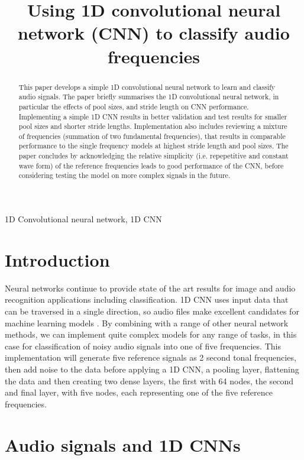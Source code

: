 \documentclass{article}
\title{Using 1D convolutional neural network (CNN) to classify audio frequencies}
\begin{document}
%
\maketitle
%
\begin{abstract}
This paper develops a simple 1D convolutional neural network to learn and classify audio signals.  The paper briefly summarises the 1D convolutional neural network, in particular the effects of pool sizes, and stride length on CNN performance.  Implementing a simple 1D CNN results in better validation and test results for smaller pool sizes and shorter stride lengths.  Implementation also includes reviewing a mixture of frequencies (summation of two fundamental frequencies), that results in comparable performance to the single frequency models at highest stride length and pool sizes.  The paper concludes by acknowledging the relative simplicity (i.e. repepetitive and constant wave form) of the reference frequencies leads to good performance of the CNN, before considering testing the model on more complex signals in the future.
\end{abstract}
%
\begin{keywords}
1D Convolutional neural network, 1D CNN
\end{keywords}
%
\section{Introduction}
\label{sec:intro}
%
Neural networks continue to provide state of the art results for image and audio recognition applications \cite{brownlee_1d_2018} including classification.  1D CNN uses input data that can be traversed in a single direction, so audio files make excellent candidates for machine learning models \cite{noauthor_convolutional_nodate}.  By combining with a range of other neural network methods, we can implement quite complex models for any range of tasks, in this case for classification of noisy audio signals into one of five frequencies.  This implementation will generate five reference signals as 2 second tonal frequencies, then add noise to the data before applying a 1D CNN, a pooling layer, flattening the data and then creating two dense layers, the first with 64 nodes, the second and final layer, with five nodes, each representing one of the five reference frequencies.

\section{Audio signals and 1D CNNs}
\label{sec:format}
\end{document}
